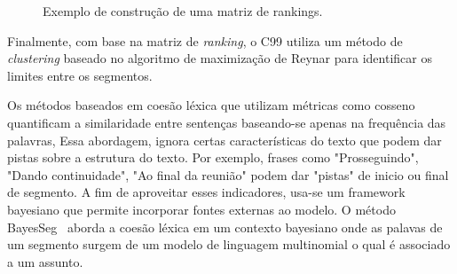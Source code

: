 \begin{figure}[!h]
	\centering     %

	
	\caption{Exemplo de construção de uma matriz de rankings.%
	}
	\label{fig:exemplomatrixrank}
\end{figure}



Finalmente, com base na matriz de \textit{ranking}, o C99 utiliza um método de \textit{clustering} baseado no algoritmo de maximização de Reynar para identificar os limites entre os segmentos. 














Os métodos baseados em coesão léxica que utilizam métricas como cosseno quantificam a similaridade entre sentenças baseando-se apenas na frequência das palavras, Essa abordagem, ignora certas características do texto que podem dar pistas sobre a estrutura do texto. Por exemplo, frases como "Prosseguindo", "Dando continuidade", "Ao final da reunião" podem dar "pistas" de inicio ou final de segmento. A fim de aproveitar esses indicadores, usa-se um framework bayesiano que permite incorporar fontes externas ao modelo. O método BayesSeg~\cite{Eisenstein2008} aborda a coesão léxica em um contexto bayesiano onde as palavas de um segmento surgem de um modelo de linguagem multinomial o qual é associado a um assunto. 

